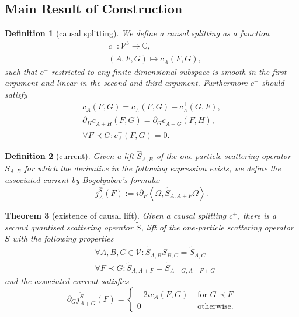 \documentclass[b5paper,draft,openbib,12pt]{memoir}
\newtheorem{Def}{Definition}
\newtheorem{Thm}[Def]{Theorem}
\begin{document}
\subsection{Main Result of Construction}


\begin{Def}[causal splitting]
We define a causal splitting as a function 
\begin{align}
&c^+:\mathcal{V}^3\rightarrow \mathbb{C}, \\
&(A,F,G)\mapsto c_A^+(F,G),
\end{align}
such that \(c^+\) restricted to any finite dimensional subspace is smooth in the 
first argument and linear in the second and third argument.
Furthermore \(c^+\) should satisfy
\begin{align}\label{c+ 1}
c_A(F,G)=c_A^+(F,G)-c_A^+(G,F),\\\label{c+ 2}
\partial_H c^+_{A+H}(F,G)=\partial_G c^+_{A+G}(F,H),\\\label{c+ 3}
\forall F \prec G: c_A^+(F,G)=0.
\end{align}
\end{Def}

\begin{Def}[current]
Given a lift \(\hat{S}_{A,B}\) of the one-particle scattering operator \(S_{A,B}\) for which the derivative in the following expression exists,
 we define the associated current by Bogolyubov's formula:
\begin{equation}
j_A^{\hat{S}}(F):=i\partial_F \left\langle \Omega, \hat{S}_{A,A+F} \Omega\right\rangle.
\end{equation}
\end{Def}

\begin{Thm}[existence of causal lift]\label{thm: geometry}
Given a causal splitting \(c^+\), there is a second quantised scattering operator \(\tilde{S}\), lift of the one-particle scattering operator \(S\)
with the following properties
\begin{align}
&\forall A,B,C\in \mathcal{V}:\tilde{S}_{A,B}\tilde{S}_{B,C}=\tilde{S}_{A,C}\\
&\forall F\prec G: \tilde{S}_{A,A+F}=\tilde{S}_{A+G,A+F+G}
\end{align}
and the associated current satisfies
\begin{equation}
\partial_G j_{A+G}^{\tilde{S}}(F)=\left\{\begin{matrix} -2i c_A(F,G)  &\text{ for } G\prec F\\ 0 &\text{  otherwise.}  \end{matrix} \right.
\end{equation}
\end{Thm}
\end{document}

